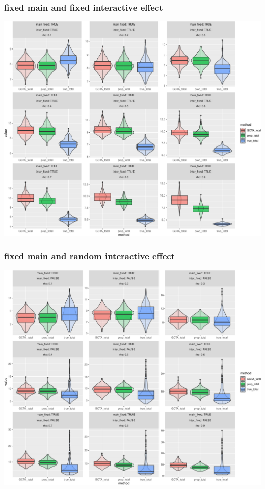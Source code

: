 \documentclass[]{article}
\begin{document}
\subsubsection{fixed main and fixed interactive
effect}\label{fixed-main-and-fixed-interactive-effect}

\includegraphics{block_decorrelation_report_files/figure-latex/fixed fixed only main-1.pdf}

\subsubsection{fixed main and random interactive
effect}\label{fixed-main-and-random-interactive-effect}

\includegraphics{block_decorrelation_report_files/figure-latex/fixed random only main-1.pdf}
\end{document}
